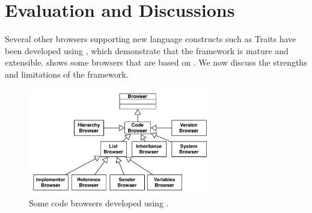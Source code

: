 \documentclass[a4paper,10pt,twoside]{book}
\begin{document}


\section{Evaluation and Discussions} 

Several other browsers supporting new language constructs such as Traits have been developed using \ob, which demonstrate that the framework is mature and extensible.  shows some browsers that are based on \ob. We now discuss the strengths and limitations of the framework.



\begin{figure}
\begin{center}
\includegraphics[width=8cm]{BrowserFamily}
\caption{Some code browsers developed using \obf.}
\end{center}
\end{figure}
\end{document}
